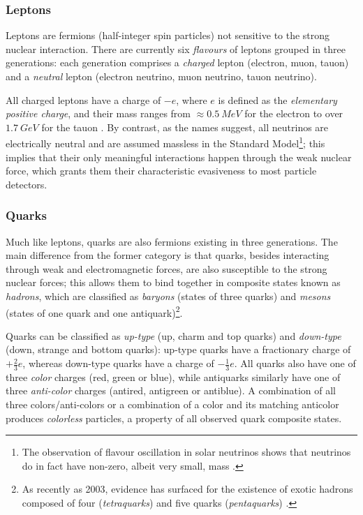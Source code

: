 \subsubsection{Leptons}
Leptons are fermions (half-integer spin particles) not sensitive to the strong nuclear interaction.
There are currently six \textit{flavours} of leptons grouped in three generations: each generation comprises a \textit{charged} lepton (electron, muon, tauon) and a \textit{neutral} lepton (electron neutrino, muon neutrino, tauon neutrino).

All charged leptons have a charge of $-e$, where $e$ is defined as the \textit{elementary positive charge}, and their mass ranges from $\approx \SI{0.5}{MeV}$ for the electron to over $\SI{1.7}{GeV}$ for the tauon \cite{PDG}.
By contrast, as the names suggest, all neutrinos are electrically neutral and are assumed massless in the Standard Model\footnote{The observation of flavour oscillation in solar neutrinos shows that neutrinos do in fact have non-zero, albeit very small, mass \cite{SNO}.}; this implies that their only meaningful interactions happen through the weak nuclear force, which grants them their characteristic evasiveness to most particle detectors.


\subsubsection{Quarks}
Much like leptons, quarks are also fermions existing in three generations. The main difference from the former category is that quarks, besides interacting through weak and electromagnetic forces, are also susceptible to the strong nuclear forces; this allows them to bind together in composite states known as \textit{hadrons}, which are classified as \textit{baryons} (states of three quarks) and \textit{mesons} (states of one quark and one antiquark)\footnote{As recently as 2003, evidence has surfaced for the existence of exotic hadrons composed of four (\textit{tetraquarks}) \cite{tetraquark} and five quarks (\textit{pentaquarks}) \cite{pentaquark}.}.

Quarks can be classified as \textit{up-type} (up, charm and top quarks) and \textit{down-type} (down, strange and bottom quarks): up-type quarks have a fractionary charge of $+\frac{2}{3} e$, whereas down-type quarks have a charge of $-\frac{1}{3} e$. All quarks also have one of three \textit{color} charges (red, green or blue), while antiquarks similarly have one of three \textit{anti-color} charges (antired, antigreen or antiblue). A combination of all three colors/anti-colors or a combination of a color and its matching anticolor produces \textit{colorless} particles, a property of all observed quark composite states.

